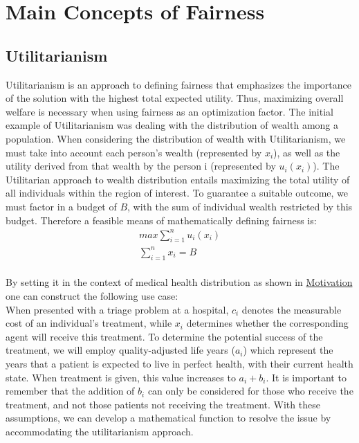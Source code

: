 \documentclass[german, a4paper, 11pt, oneside]{scrbook}
\begin{document}
\section{Main Concepts of Fairness}
\subsection{Utilitarianism}
Utilitarianism is an approach to defining fairness that emphasizes the importance of the solution with the highest total expected utility. Thus, maximizing overall welfare is necessary when using fairness as an optimization factor. The initial example of Utilitarianism was dealing with the distribution of wealth among a population. When considering the distribution of wealth with Utilitarianism, we must take into account each person's wealth (represented by $x_i$), as well as the utility derived from that wealth by the person i (represented by $u_i(x_i)$). The Utilitarian approach to wealth distribution entails maximizing the total utility of all individuals within the region of interest. To guarantee a suitable outcome, we must factor in a budget of $B$, with the sum of individual wealth restricted by this budget. \cite{.,XinyingChen.2023} Therefore a feasible means of mathematically defining fairness is:\\
\begin{align}
   max\sum_{i=1}^{n} u_i(x_i) \\ \sum_{i=1}^{n} x_i = B
\end{align}
\\ \cite{XinyingChen.2023}
By setting it in the context of medical health distribution as shown in \hyperref[sec:motivation]{Motivation} one can construct the following use case:\\ When presented with a triage problem at a hospital, $c_i$ denotes the measurable cost of an individual's treatment, while $x_i$ determines whether the corresponding agent will receive this treatment. To determine the potential success of the treatment, we will employ quality-adjusted life years ($a_i$) which represent the years that a patient is expected to live in perfect health, with their current health state. When treatment is given, this value increases to $a_i + b_i$. It is important to remember that the addition of $b_i$ can only be considered for those who receive the treatment, and not those patients not receiving the treatment. With these assumptions, we can develop a mathematical function to resolve the issue by accommodating the utilitarianism approach.\cite{XinyingChen.2023} \\
\end{document}

